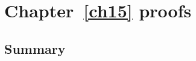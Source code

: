 \chapter{Chapter~\ref{ch15} proofs}

\newpage
\section{Summary}\label{ch15.ps.summary}
\lpscriptsummary
